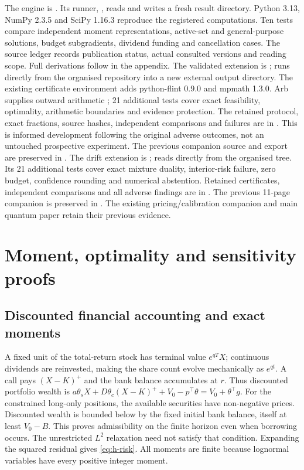 \documentclass[11pt]{article}
\begin{document}
The engine is . Its runner,
, reads
 and writes a fresh result
directory. Python 3.13, NumPy 2.3.5 and SciPy 1.16.3 reproduce the
registered computations. Ten tests compare independent moment
representations, active-set and general-purpose solutions, budget
subgradients, dividend funding and cancellation cases.
The source ledger records publication status, actual consulted versions
and reading scope. Full derivations follow in the appendix.
The validated extension is ;
 runs directly from the
organised repository into a new external output directory. The existing
certificate environment adds python-flint 0.9.0 and mpmath 1.3.0.
Arb supplies outward arithmetic \citep{johansson2017}; 21 additional tests
cover exact feasibility, optimality, arithmetic boundaries and evidence
protection. The retained protocol, exact fractions, source hashes,
independent comparisons and failures are in
.
This is informed development following the original adverse outcomes,
not an untouched prospective experiment. The previous companion source
and export are preserved in
.
The drift extension is ;
 reads
 directly from the organised tree.
Its 21 additional tests cover exact mixture duality, interior-risk failure,
zero budget, confidence rounding and numerical abstention. Retained
certificates, independent comparisons and all adverse findings are in
. The previous 11-page companion
is preserved in .
The existing pricing/calibration companion and main quantum paper
retain their previous evidence.

\appendix
\section{Moment, optimality and sensitivity proofs}
\label{app:h-proofs}

\subsection{Discounted financial accounting and exact moments}

A fixed unit of the total-return stock has terminal value $e^{qT}X$;
continuous dividends are reinvested, making the share count evolve
mechanically as $e^{qt}$. A call pays $(X-K)^+$ and the
bank balance accumulates at $r$. Thus discounted portfolio wealth is
$a\theta_sX+D\theta_c(X-K)^++V_0-p^\top\theta
=V_0+\theta^\top g$. For the constrained long-only positions,
the available securities have non-negative prices. Discounted wealth
is bounded below by the fixed initial bank balance, itself at least
$V_0-B$. This proves admissibility on the finite horizon even when
borrowing occurs. The unrestricted $L^2$ relaxation need not satisfy
that condition. Expanding the squared residual gives \eqref{eq:h-risk}.
All moments are finite because lognormal variables have every positive
integer moment.
\end{document}
